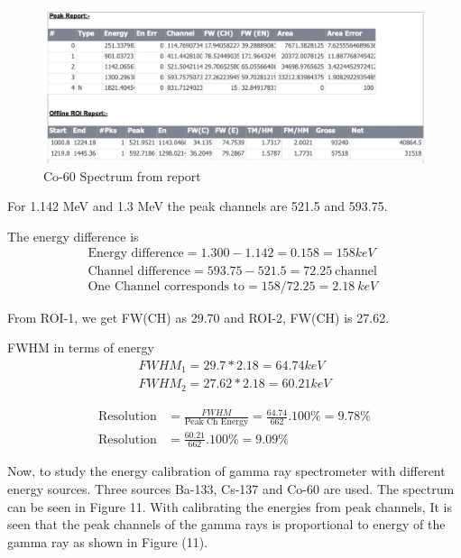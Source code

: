 \documentclass[a4paper, amsfonts, amssymb, amsmath, reprint, showkeys, nofootinbib, twoside]{revtex4-1}
\begin{document}
\begin{figure}[h]
	\centering
	\includegraphics[width=\textwidth]{co}
	\caption{Co-60 Spectrum from report}
\end{figure}

For 1.142 MeV and 1.3 MeV the peak channels are 521.5 and 593.75. 

The energy difference is 
\begin{align}
	\text{Energy difference}=1.300-1.142=0.158= 158 keV\\
	\text{Channel difference}=593.75-521.5=72.25~ \text{channel }\\
	\text{One Channel corresponds to}=158/72.25=2.18~ keV
\end{align}

From ROI-1, we get FW(CH) as 29.70 and ROI-2, FW(CH) is 27.62. 

FWHM in terms of energy
\begin{align}
FWHM_1=29.7*2.18=64.74 keV\\
FWHM_2=27.62*2.18=60.21 keV
\end{align}

\begin{align}
	\text{Resolution}&=\frac{FWHM}{\text{Peak Ch Energy}}=\frac{64.74}{662}.100\%=9.78\%\\
	\text{Resolution}&=\frac{60.21}{662}.100\%=9.09\%
\end{align}

Now, to study the energy calibration of gamma ray spectrometer with different energy sources. Three sources Ba-133, Cs-137 and Co-60 are used. The spectrum can be seen in  Figure 11. With calibrating the energies from peak channels, It is seen that the peak channels of the gamma rays is proportional to energy of the gamma ray as shown in Figure (11). 
\end{document}
